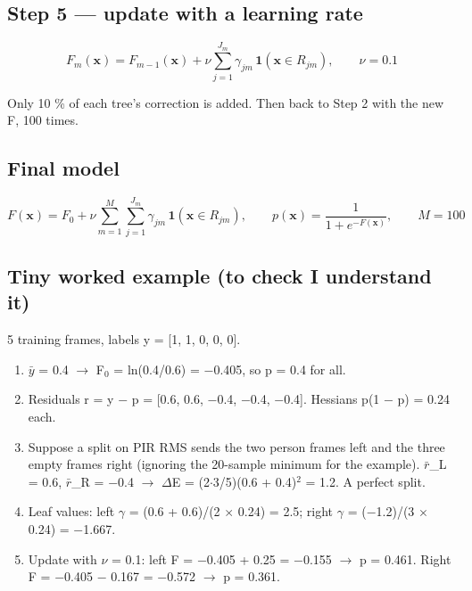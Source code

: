 \documentclass[11pt,a4paper]{article}
\providecommand{\tightlist}{\setlength{\itemsep}{0pt}\setlength{\parskip}{0pt}}
\begin{document}
\hypertarget{step-5-update-with-a-learning-rate}{%
\subsection{Step 5 --- update
with a learning
rate}\label{step-5-update-with-a-learning-rate}}

\[
F_m(\mathbf{x}) = F_{m-1}(\mathbf{x}) + \nu\sum_{j=1}^{J_m}\gamma_{jm}\,\mathbf{1}(\mathbf{x}\in R_{jm}), \qquad \nu = 0.1
\]

Only 10 \% of each tree's
correction is added. Then back
to Step 2 with the new F, 100
times.

\hypertarget{final-model}{%
\subsection{Final
model}\label{final-model}}

\[
F(\mathbf{x}) = F_0 + \nu\sum_{m=1}^{M}\sum_{j=1}^{J_m}\gamma_{jm}\,\mathbf{1}(\mathbf{x}\in R_{jm}), \qquad p(\mathbf{x}) = \frac{1}{1+e^{-F(\mathbf{x})}}, \qquad M = 100
\]

\hypertarget{tiny-worked-example-to-check-i-understand-it}{%
\subsection{Tiny worked
example (to check I understand
it)}\label{tiny-worked-example-to-check-i-understand-it}}

5 training frames, labels y =
{[}1, 1, 0, 0, 0{]}.

\begin{enumerate}
\def\labelenumi{\arabic{enumi}.}
\tightlist
\item
  $\bar{y}$ = 0.4 $\rightarrow$ F$_0$ = ln(0.4/0.6) =
  $-$0.405, so p = 0.4 for all.
\item
  Residuals r = y $-$ p =
  {[}0.6, 0.6, $-$0.4, $-$0.4,
  $-$0.4{]}. Hessians p(1 $-$ p) =
  0.24 each.
\item
  Suppose a split on PIR RMS
  sends the two person frames
  left and the three empty
  frames right (ignoring the
  20-sample minimum for the
  example). $\bar{r}$\_L = 0.6, $\bar{r}$\_R =
  $-$0.4 $\rightarrow$ $\Delta$E = (2$\cdot$3/5)(0.6 +
  0.4)$^2$ = 1.2. A perfect
  split.
\item
  Leaf values: left $\gamma$ = (0.6 +
  0.6)/(2 $\times$ 0.24) = 2.5; right
  $\gamma$ = ($-$1.2)/(3 $\times$ 0.24) =
  $-$1.667.
\item
  Update with $\nu$ = 0.1: left F
  = $-$0.405 + 0.25 = $-$0.155 $\rightarrow$ p
  = 0.461. Right F = $-$0.405 $-$
  0.167 = $-$0.572 $\rightarrow$ p = 0.361.
\end{enumerate}
\end{document}
